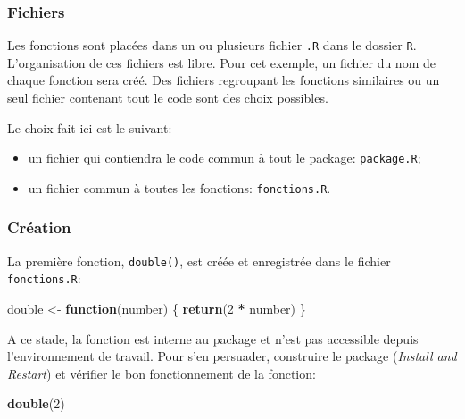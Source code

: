 \documentclass[
  12pt,
  french,
  a4paper,
  extrafontsizes,onecolumn,openright
  ]{memoir}
\newenvironment{Shaded}{\begin{snugshade}}{\end{snugshade}}
\newcommand{\ControlFlowTok}[1]{\textcolor[rgb]{0.13,0.29,0.53}{\textbf{#1}}}
\newcommand{\DecValTok}[1]{\textcolor[rgb]{0.00,0.00,0.81}{#1}}
\newcommand{\KeywordTok}[1]{\textcolor[rgb]{0.13,0.29,0.53}{\textbf{#1}}}
\newcommand{\NormalTok}[1]{#1}
\newcommand{\OperatorTok}[1]{\textcolor[rgb]{0.81,0.36,0.00}{\textbf{#1}}}
\newcommand{\StringTok}[1]{\textcolor[rgb]{0.31,0.60,0.02}{#1}}
\providecommand{\tightlist}{%
  \setlength{\itemsep}{0pt}\setlength{\parskip}{0pt}}
\begin{document}
\hypertarget{fichiers}{%
\subsubsection{Fichiers}\label{fichiers}}

Les fonctions sont placées dans un ou plusieurs fichier \texttt{.R} dans le dossier \texttt{R}.
L'organisation de ces fichiers est libre.
Pour cet exemple, un fichier du nom de chaque fonction sera créé.
Des fichiers regroupant les fonctions similaires ou un seul fichier contenant tout le code sont des choix possibles.

Le choix fait ici est le suivant:

\begin{itemize}
\tightlist
\item
  un fichier qui contiendra le code commun à tout le package: \texttt{package.R};
\item
  un fichier commun à toutes les fonctions: \texttt{fonctions.R}.
\end{itemize}

\hypertarget{cruxe9ation-1}{%
\subsubsection{Création}\label{cruxe9ation-1}}

La première fonction, \texttt{double()}, est créée et enregistrée dans le fichier \texttt{fonctions.R}:

\scriptsize

\begin{Shaded}
\begin{Highlighting}[]
\NormalTok{double <-}\StringTok{ }\ControlFlowTok{function}\NormalTok{(number) \{}
    \KeywordTok{return}\NormalTok{(}\DecValTok{2} \OperatorTok{*}\StringTok{ }\NormalTok{number)}
\NormalTok{\}}
\end{Highlighting}
\end{Shaded}

\normalsize

A ce stade, la fonction est interne au package et n'est pas accessible depuis l'environnement de travail.
Pour s'en persuader, construire le package (\emph{Install and Restart}) et vérifier le bon fonctionnement de la fonction:

\scriptsize

\begin{Shaded}
\begin{Highlighting}[]
\KeywordTok{double}\NormalTok{(}\DecValTok{2}\NormalTok{)}
\end{Highlighting}
\end{Shaded}
\end{document}
